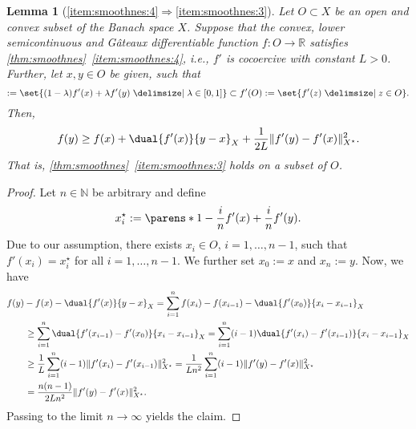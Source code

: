 \documentclass[
	english
]{scrartcl}
\numberwithin{equation}{section} %
\providecommand\given{\nonscript\;\delimsize|\nonscript\;\mathopen{}}
\DeclarePairedDelimiter\norm{\lVert}{\rVert}
\DeclarePairedDelimiter\parens()
\newcommand\N{\mathbb{N}}
\newcommand\R{\mathbb{R}}
\newcommand{\dualspace}{^\star}
\newtheorem{lemma}[theorem]{Lemma}
\begin{document}
\begin{lemma}[\ref{item:smoothnes:4}\texorpdfstring{$\Rightarrow$}{=>}\ref{item:smoothnes:3}]
	\label{lem:on_smoothness_3}
	Let $O \subset X$ be an open and convex subset of the Banach space $X$.
	Suppose that
	the convex, lower semicontinuous and
	Gâteaux differentiable function
	$f \colon O \to \R$
	satisfies
	\cref{thm:smoothnes}~\ref{item:smoothnes:4},
	i.e.,
	$f'$ is cocoercive with constant $L > 0$.
	Further, let $x,y \in O$ be given, such that
	\begin{equation*}
		[f'(x), f'(y)]
		:=
		\set{
			(1-\lambda) f'(x) + \lambda f'(y)
			\given
			\lambda \in [0,1]
		}
		\subset
		f'(O)
		:=
		\set{
			f'(z)
			\given
			z \in O
		}
		.
	\end{equation*}
	Then,
	\begin{equation*}
		f(y) \ge f(x) + \dual{f'(x)}{y - x}_X + \frac 1{2 L} \norm{f'(y) - f'(x)}_{X\dualspace}^2
		.
	\end{equation*}
	That is,
	\cref{thm:smoothnes}~\ref{item:smoothnes:3}
	holds on a subset of $O$.
\end{lemma}
\begin{proof}
	Let $n \in \N$ be arbitrary
	and define
	\begin{equation}
		\label{eq:xip}
		x_i\dualspace :=
		\parens*{
			1 - \frac{i}{n}
		} f'(x)
		+
		\frac{i}{n} f'(y)
		.
	\end{equation}
	Due to our assumption, there exists $x_i \in O$, $i = 1,\ldots, n-1$,
	such that $f'(x_i) = x_i\dualspace$ for all $i = 1, \ldots, n-1$.
	We further set $x_0 := x$ and $x_n := y$.
	Now, we have
	\begin{align*}
		&f(y) - f(x) - \dual{f'(x)}{y - x}_X
		=
		\sum_{i = 1}^n f(x_i) - f(x_{i-1}) - \dual{f'(x_0)}{x_i - x_{i-1}}_X
		\\&\qquad
		\ge
		\sum_{i = 1}^n \dual{f'(x_{i-1}) - f'(x_0)}{x_i - x_{i-1}}_X
		=
		\sum_{i = 1}^n (i-1) \dual{f'(x_i) - f'(x_{i-1})}{x_i - x_{i-1}}_X
		\\&\qquad
		\ge
		\frac1L \sum_{i = 1}^n (i-1) \norm{f'(x_i) - f'(x_{i-1})}_{X\dualspace}^2
		=
		\frac1{L n^2} \sum_{i = 1}^n (i-1) \norm{f'(y) - f'(x)}_{X\dualspace}^2
		\\&\qquad
		=
		\frac{n (n-1)}{2 L n^2} \norm{f'(y) - f'(x)}_{X\dualspace}^2
		.
	\end{align*}
	Passing to the limit $n \to \infty$ yields the claim.
\end{proof}
\end{document}
